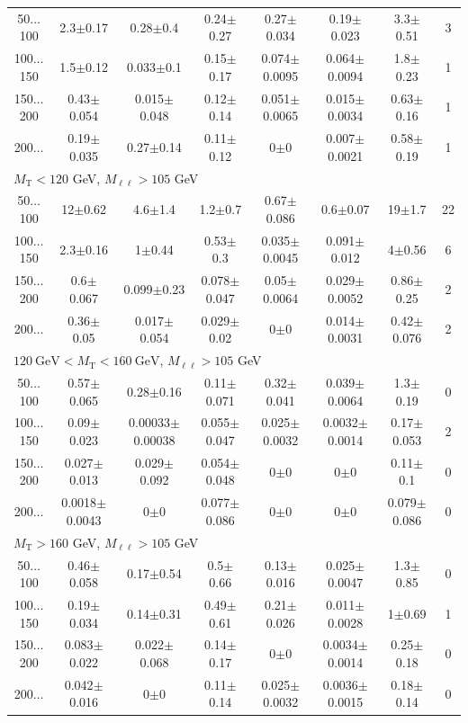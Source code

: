 \begin{landscape}
\begin{table}
\begin{center}
\begin{tabular}{| c | c c c c c c c | }
50$\dots$100&2.3$\pm$0.17&0.28$\pm$0.4&0.24$\pm$0.27&0.27$\pm$0.034&0.19$\pm$0.023&3.3$\pm$0.51&3\\
100$\dots$150&1.5$\pm$0.12&0.033$\pm$0.1&0.15$\pm$0.17&0.074$\pm$0.0095&0.064$\pm$0.0094&1.8$\pm$0.23&1\\
150$\dots$200&0.43$\pm$0.054&0.015$\pm$0.048&0.12$\pm$0.14&0.051$\pm$0.0065&0.015$\pm$0.0034&0.63$\pm$0.16&1\\
200$\dots$&0.19$\pm$0.035&0.27$\pm$0.14&0.11$\pm$0.12&0$\pm$0&0.007$\pm$0.0021&0.58$\pm$0.19&1\\
\hline\hline
\multicolumn{8}{l}{$M_{\text{T}} < 120$ GeV, $M_{\ell\ell} > 105$ GeV}\\\hline\hline
50$\dots$100&12$\pm$0.62&4.6$\pm$1.4&1.2$\pm$0.7&0.67$\pm$0.086&0.6$\pm$0.07&19$\pm$1.7&22\\
100$\dots$150&2.3$\pm$0.16&1$\pm$0.44&0.53$\pm$0.3&0.035$\pm$0.0045&0.091$\pm$0.012&4$\pm$0.56&6\\
150$\dots$200&0.6$\pm$0.067&0.099$\pm$0.23&0.078$\pm$0.047&0.05$\pm$0.0064&0.029$\pm$0.0052&0.86$\pm$0.25&2\\
200$\dots$&0.36$\pm$0.05&0.017$\pm$0.054&0.029$\pm$0.02&0$\pm$0&0.014$\pm$0.0031&0.42$\pm$0.076&2\\
\hline\hline
\multicolumn{8}{l}{$120~\mathrm{GeV} < M_{\text{T}} < 160~\mathrm{GeV}$, $M_{\ell\ell} > 105$ GeV}\\\hline\hline
50$\dots$100&0.57$\pm$0.065&0.28$\pm$0.16&0.11$\pm$0.071&0.32$\pm$0.041&0.039$\pm$0.0064&1.3$\pm$0.19&0\\
100$\dots$150&0.09$\pm$0.023&0.00033$\pm$0.00038&0.055$\pm$0.047&0.025$\pm$0.0032&0.0032$\pm$0.0014&0.17$\pm$0.053&2\\
150$\dots$200&0.027$\pm$0.013&0.029$\pm$0.092&0.054$\pm$0.048&0$\pm$0&0$\pm$0&0.11$\pm$0.1&0\\
200$\dots$&0.0018$\pm$0.0043&0$\pm$0&0.077$\pm$0.086&0$\pm$0&0$\pm$0&0.079$\pm$0.086&0\\
\hline\hline
\multicolumn{8}{l}{$M_{\text{T}} > 160$ GeV, $M_{\ell\ell} > 105$ GeV}\\\hline\hline
50$\dots$100&0.46$\pm$0.058&0.17$\pm$0.54&0.5$\pm$0.66&0.13$\pm$0.016&0.025$\pm$0.0047&1.3$\pm$0.85&0\\
100$\dots$150&0.19$\pm$0.034&0.14$\pm$0.31&0.49$\pm$0.61&0.21$\pm$0.026&0.011$\pm$0.0028&1$\pm$0.69&1\\
150$\dots$200&0.083$\pm$0.022&0.022$\pm$0.068&0.14$\pm$0.17&0$\pm$0&0.0034$\pm$0.0014&0.25$\pm$0.18&0\\
200$\dots$&0.042$\pm$0.016&0$\pm$0&0.11$\pm$0.14&0.025$\pm$0.0032&0.0036$\pm$0.0015&0.18$\pm$0.14&0\\

\end{tabular}
\end{center}
\end{table}
\end{landscape}
